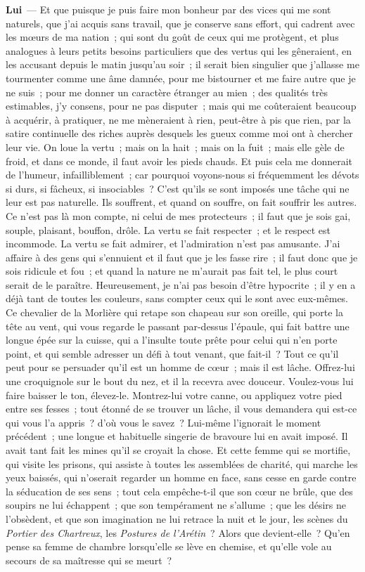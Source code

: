 \documentclass[french,twoside]{book} %
\newcommand{\labelchar}[1]{\textbf{\color{rubric} #1}}
\begin{document}
\labelchar{Lui} — Et que puisque je puis faire mon bonheur par des vices qui me sont naturels, que j’ai acquis sans travail, que je conserve sans effort, qui cadrent avec les mœurs de ma nation ; qui sont du goût de ceux qui me protègent, et plus analogues à leurs petits besoins particuliers que des vertus qui les gêneraient, en les accusant depuis le matin jusqu’au soir ; il serait bien singulier que j’allasse me tourmenter comme une âme damnée, pour me bistourner et me faire autre que je ne suis ; pour me donner un caractère étranger au mien ; des qualités très estimables, j’y consens, pour ne pas disputer ; mais qui me coûteraient beaucoup à acquérir, à pratiquer, ne me mèneraient à rien, peut-être à pis que rien, par la satire continuelle des riches auprès desquels les gueux comme moi ont à chercher leur vie. On loue la vertu ; mais on la hait ; mais on la fuit ; mais elle gèle de froid, et dans ce monde, il faut avoir les pieds chauds. Et puis cela me donnerait de l’humeur, infailliblement ; car pourquoi voyons-nous si fréquemment les dévots si durs, si fâcheux, si insociables ? C’est qu’ils se sont imposés une tâche qui ne leur est pas naturelle. Ils souffrent, et quand on souffre, on fait souffrir les autres. Ce n’est pas là mon compte, ni celui de mes protecteurs ; il faut que je sois gai, souple, plaisant, bouffon, drôle. La vertu se fait respecter ; et le respect est incommode. La vertu se fait admirer, et l’admiration n’est pas amusante. J’ai affaire à des gens qui s’ennuient et il faut que je les fasse rire ; il faut donc que je sois ridicule et fou ; et quand la nature ne m’aurait pas fait tel, le plus court serait de le paraître. Heureusement, je n’ai pas besoin d’être hypocrite ; il y en a déjà tant de toutes les couleurs, sans compter ceux qui le sont avec eux-mêmes. Ce chevalier de la Morlière qui retape son chapeau sur son oreille, qui porte la tête au vent, qui vous regarde le passant par-dessus l’épaule, qui fait battre une longue épée sur la cuisse, qui a l’insulte toute prête pour celui qui n’en porte point, et qui semble adresser un défi à tout venant, que fait-il ? Tout ce qu’il peut pour se persuader qu’il est un homme de cœur ; mais il est lâche. Offrez-lui une croquignole sur le bout du nez, et il la recevra avec douceur. Voulez-vous lui faire baisser le ton, élevez-le. Montrez-lui votre canne, ou appliquez votre pied entre ses fesses ; tout étonné de se trouver un lâche, il vous demandera qui est-ce qui vous l’a appris ? d’où vous le savez ? Lui-même l’ignorait le moment précédent ; une longue et habituelle singerie de bravoure lui en avait imposé. Il avait tant fait les mines qu’il se croyait la chose. Et cette femme qui se mortifie, qui visite les prisons, qui assiste à toutes les assemblées de charité, qui marche les yeux baissés, qui n’oserait regarder un homme en face, sans cesse en garde contre la séducation de ses sens ; tout cela empêche-t-il que son cœur ne brûle, que des soupirs ne lui échappent ; que son tempérament ne s’allume ; que les désirs ne l’obsèdent, et que son imagination ne lui retrace la nuit et le jour, les scènes du \emph{Portier des Chartreux}, les \emph{Postures de l’Arétin} ? Alors que devient-elle ? Qu’en pense sa femme de chambre lorsqu’elle se lève en chemise, et qu’elle vole au secours de sa maîtresse qui se meurt ? 
\end{document}
